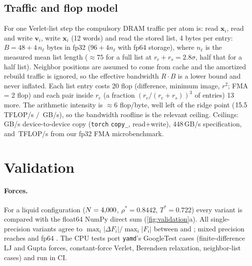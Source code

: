 \documentclass[11pt]{article}
\newcommand{\yamd}{\texttt{yamd}}
\begin{document}
\subsection{Traffic and flop model}\label{sec:traffic}
For one Verlet-list step the compulsory DRAM traffic per atom is: read $\mathbf{x}_i$, read
and write $\mathbf{v}_i$, write $\mathbf{x}_i$ (12 words) and read the stored list, 4 bytes per
entry: $B=48+4\,n_\ell$ bytes in fp32 ($96+4n_\ell$ with fp64 storage), where $n_\ell$ is the
measured mean list length (${\approx}75$ for a full list at $r_c+r_s=2.8\sigma$, half that for a
half list). Neighbor positions are assumed to come from cache and the amortized rebuild
traffic is ignored, so the effective bandwidth $R\cdot B$ is a lower bound and never
inflated. Each list entry costs 20 flop (difference, minimum image, $r^2$; FMA = 2 flop) and
each pair inside $r_c$ (a fraction $(r_c/(r_c+r_s))^3$ of entries) 13 more. The arithmetic
intensity is ${\approx}6$ flop/byte, well left of the ridge point
($15.5$\,TFLOP/s $/$ \copyBW\,GB/s), so the bandwidth roofline is the relevant ceiling.
Ceilings: \copyBW\,GB/s device-to-device copy (\texttt{torch} \texttt{copy\_}, read+write),
448\,GB/s specification, and \fmaPeak\,TFLOP/s from our fp32 FMA microbenchmark.

\section{Validation}\label{sec:validation}
\paragraph{Forces.} For a liquid configuration ($N=4{,}000$, $\rho^*=0.8442$, $T^*=0.722$) every
variant is compared with the float64 NumPy direct sum (\cref{fig:validation}a). All
single-precision variants agree to $\max_i|\Delta F_i|/\max_i|F_i|$ between \forceErrMin{} and
\forceErrMax; mixed precision reaches \forceErrMixed{} and fp64 \forceErrFpSixtyFour.
The CPU tests port \yamd's GoogleTest cases (finite-difference LJ and Gupta forces, constant-force
Verlet, Berendsen relaxation, neighbor-list cases) and run in CI.
\end{document}
